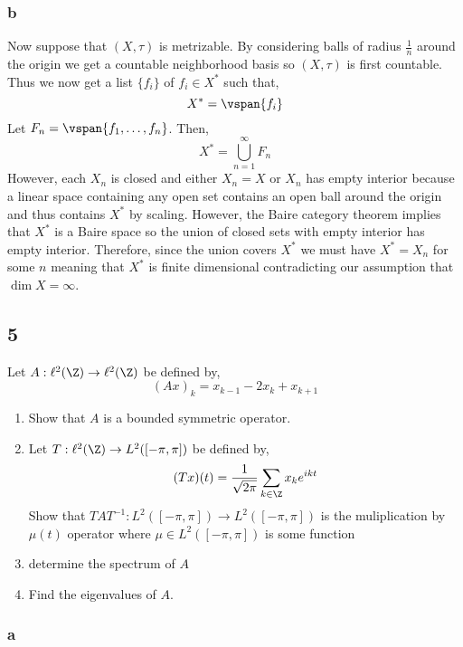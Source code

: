 \documentclass[12pt]{article}
\begin{document}
\subsubsection{b}

Now suppose that $(X, \tau)$ is metrizable. By considering balls of radius $\frac{1}{n}$ around the origin we get a countable neighborhood basis so $(X, \tau)$ is first countable. Thus we now get a list $\{ f_i \}$ of $f_i \in X^*$ such that,
\[ X^* = \vspan{f_i} \]
Let $F_n = \vspan{f_1, \dots, f_n}$. Then,
\[ X^* = \bigcup_{n = 1}^\infty F_n \]
However, each $X_n$ is closed and either $X_n = X$ or $X_n$ has empty interior because a linear space containing any open set contains an open ball around the origin and thus contains $X^*$ by scaling. However, the Baire category theorem implies that $X^*$ is a Baire space so the union of closed sets with empty interior has empty interior. Therefore, since the union covers $X^*$ we must have $X^* = X_n$ for some $n$ meaning that $X^*$ is finite dimensional contradicting our assumption that $\dim{X} = \infty$.

\subsection{5}

\begin{exercise}
Let $A : \ell^2(\Z) \to \ell^2(\Z)$ be defined by,
\[ (A x)_k = x_{k - 1} - 2 x_k + x_{k + 1} \]
\begin{enumerate}
\item Show that $A$ is a bounded symmetric operator.
\item Let $T : \ell^2(\Z) \to L^2([-\pi, \pi])$ be defined by,
\[ (T x)(t) = \frac{1}{\sqrt{2 \pi}} \sum_{k \in \Z} x_k e^{i k t} \]
Show that $T A T^{-1} : L^2([-\pi, \pi]) \to L^2([-\pi, \pi])$ is the muliplication by $\mu(t)$ operator where $\mu \in L^2([-\pi, \pi])$ is some function
\item determine the spectrum of $A$
\item Find the eigenvalues of $A$.
\end{enumerate}
\end{exercise}

\subsubsection{a}
\end{document}
